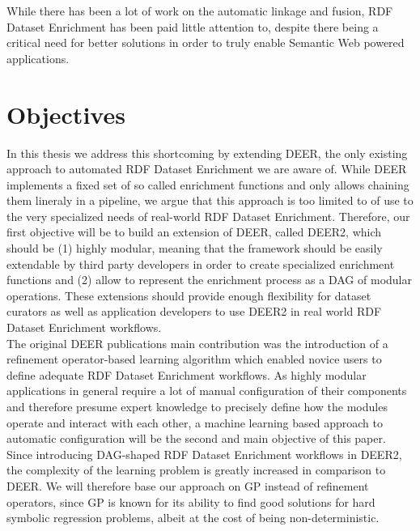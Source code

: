 While there has been a lot of work on the automatic linkage and fusion, \ac{RDF} Dataset Enrichment has been paid little attention to, despite there being a critical need for better solutions in order to truly enable  Semantic Web powered applications.

\section{Objectives}
\label{sec:objectives}
In this thesis we address this shortcoming by extending \ac{DEER}\cite{sherif:2015a}, the only existing approach to automated \ac{RDF} Dataset Enrichment we are aware of.
While DEER implements a fixed set of so called enrichment functions and only allows chaining them lineraly in a pipeline, we argue that this approach is too limited to of use to the very specialized needs of real-world \ac{RDF} Dataset Enrichment.
Therefore, our first objective will be to build an extension of \ac{DEER}, called \ac{DEER2}, which should be (1) highly modular, meaning that the framework should be easily extendable by third party developers in order to create specialized enrichment functions and (2) allow to represent the enrichment process as a \ac{DAG} of modular operations.
These extensions should provide enough flexibility for dataset curators as well as application developers to use \ac{DEER2} in real world \ac{RDF} Dataset Enrichment workflows.\\

The original \ac{DEER} publications main contribution was the introduction of a refinement operator-based learning algorithm which enabled novice users to define adequate \ac{RDF} Dataset Enrichment workflows.
As highly modular applications in general require a lot of manual configuration of their components and therefore presume expert knowledge to precisely define how the modules operate and interact with each other, a machine learning based approach to automatic configuration will be the second and main objective of this paper.\\

Since introducing \ac{DAG}-shaped \ac{RDF} Dataset Enrichment workflows in \ac{DEER2}, the complexity of the learning problem is greatly increased in comparison to \ac{DEER}.
We will therefore base our approach on \ac{GP} instead of refinement operators, since \ac{GP} is known for its ability to find good solutions for hard symbolic regression problems, albeit at the cost of being non-deterministic.

